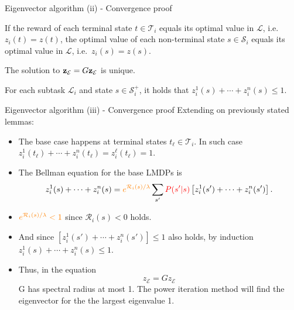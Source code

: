 \documentclass{beamer}
\theoremstyle{mystyle}
\newcommand{\cE}{\mathcal{E}}
\newcommand{\cL}{\mathcal{L}}
\newcommand{\cR}{\mathcal{R}}
\newcommand{\cS}{\mathcal{S}}
\newcommand{\cT}{\mathcal{T}}
\begin{document}
\begin{frame}{Eigenvector algorithm (ii) - Convergence proof}

\begin{lemma}[1]
    If the reward of each terminal state $t\in\cT_i$ equals its optimal value in $\cL$, i.e.~$z_i(t)=z(t)$, the optimal value of each non-terminal state $s\in\cS_i$ equals its optimal value in $\cL$, i.e.~$z_i(s)=z(s)$.
\end{lemma}

\begin{lemma}[2]
    The solution to  ${\bf z}_\cE=G{\bf z}_\cE$ is unique.
\end{lemma}
    

\begin{lemma}[3]
    For each subtask $\cL_i$ and state $s\in\cS_i^+$, it holds that $z_i^1(s)+\cdots+z_i^n(s)\leq 1$.
\end{lemma}

\end{frame}

\begin{frame}{Eigenvector algorithm (iii) - Convergence proof}
Extending on previously stated lemmas:
\begin{itemize}
    \item The base case happens at terminal states $t_\ell\in\cT_i$. In such case $z_i^1(t_\ell)+\cdots+z_i^n(t_\ell) = z_i^\ell(t_\ell) = 1$.
    \item The Bellman equation for the base LMDPs is \[
    z_i^1(s)+\cdots+z_i^n(s)=
    {\color{orange} e^{\cR_i(s)/\lambda}}
    \sum_{s'}{\color{red} P(s'|s)}\left[z_i^1(s')+\cdots+z_i^n(s')\right].
    \]

\item ${\color{orange} e^{\cR_i(s)/\lambda} < 1}$ since $\cR_i(s) < 0$ holds.

\item And since $\left[z_i^1(s')+\cdots+z_i^n(s')\right] \leq 1$ also holds, by induction $z_i^1(s)+\cdots+z_i^n(s) \leq 1$.

\item Thus, in the equation\[ z_\cE = G z_\cE \]G has spectral radius at most 1. The power iteration method will find the eigenvector for the the largest eigenvalue 1.



\end{itemize}
    
\end{frame}
\end{document}
